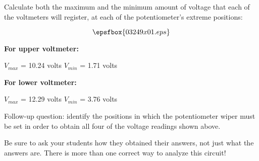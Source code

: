 

Calculate both the maximum and the minimum amount of voltage that each of the voltmeters will register, at each of the potentiometer's extreme positions:

$$\epsfbox{03249x01.eps}$$







\noindent
{\bf For upper voltmeter:}

$V_{max}$ = 10.24 volts  \hskip 15pt $V_{min}$ = 1.71 volts

\vskip 10pt

\noindent
{\bf For lower voltmeter:}

$V_{max}$ = 12.29 volts  \hskip 15pt $V_{min}$ = 3.76 volts

\vskip 10pt

Follow-up question: identify the positions in which the potentiometer wiper must be set in order to obtain all four of the voltage readings shown above.







Be sure to ask your students how they obtained their answers, not just what the answers are.  There is more than one correct way to analyze this circuit!




